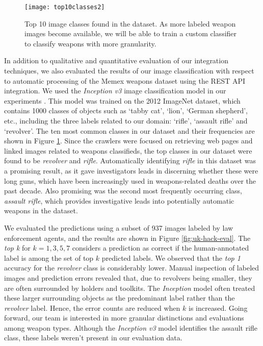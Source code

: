 \begin{figure}
	\texttt{[image: top10classes2]}
	\caption{Top 10 image classes found in the dataset. As more labeled weapon images become available, we will be able to train a custom classifier to classify weapons with more granularity.}
	\label{fig:top10ImgClass}
\end{figure}


In addition to qualitative and quantitative evaluation of our integration techniques, we also evaluated the results of our image classification with respect to automatic processing of the Memex weapons dataset using the REST API integration.  We used the \textit{Inception v3} image classification model in our experiments \cite{SzegedyVISW15}. This model was trained on the 2012 ImageNet dataset, which contains 1000 classes of objects such as `tabby cat', `lion', `German shepherd', etc.,\cite{LSVRC12Synsets, ILSVRC15} including the three labels related to our domain: `rifle', `assault rifle' and `revolver'. The ten most common classes in our dataset and their frequencies are shown in Figure \ref{fig:top10ImgClass}. Since the crawlers were focused on retrieving web pages and linked images related to weapons classifieds, the top classes in our dataset were found to be \textit{revolver} and \textit{rifle}. Automatically identifying \textit{rifle} in this dataset was a promising result, as it gave investigators leads in discerning whether these were long guns, which have been increasingly used in weapons-related deaths over the past decade. Also promising was the second most frequently occurring class, \textit{assault rifle}, which provides investigative leads into potentially automatic weapons in the dataset.

We evaluated the predictions using a subset of 937 images labeled by law enforcement agents, and the results are shown in Figure \ref{fig:uk-hack-eval}. The \textit{top k} for $k=1,3,5,7$ considers a prediction as correct if the human-annotated label is among the set of top $k$  predicted labels. We observed that the \textit{top 1} accuracy for the \textit{revolver} class is considerably lower. Manual inspection of labeled images and prediction errors revealed that, due to revolvers being smaller, they are often surrounded by holders and toolkits. The \textit{Inception} model often treated these larger surrounding objects as the predominant label rather than the \textit{revolver} label. Hence, the error counts are reduced when $k$ is increased. Going forward, our team is interested in more granular distinctions and evaluations among weapon types. Although the \textit{Inception v3} model identifies the assault rifle class, these labels weren't present in our evaluation data. 

